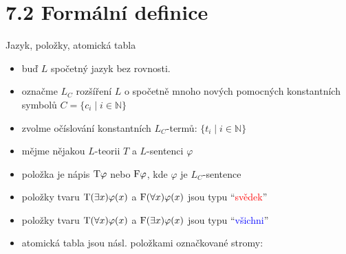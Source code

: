 \documentclass{beamer}
\begin{document}
\section{7.2 Formální definice}


\begin{frame}{Jazyk, položky, atomická tabla}

    \begin{itemize}
        \item buď $L$ \alert{spočetný} jazyk \alert{bez rovnosti}.
        \item označme $L_C$ rozšíření $L$ o spočetně mnoho nových \alert{pomocných} konstantních symbolů $C=\{c_i\mid i\in \mathbb N\}$
        \item zvolme očíslování konstantních $L_C$-termů: $\{t_i\mid i\in\mathbb N\}$
        \item mějme nějakou $L$-teorii $T$ a $L$-sentenci $\varphi$
        \item \alert{položka} je nápis $\mathrm{T}\varphi$ nebo $\mathrm{F}\varphi$, kde $\varphi$ je $L_C$-sentence
        \item položky tvaru $\mathrm{T}(\exists x)\varphi(x)$ a $\mathrm{F}(\forall x)\varphi(x)$ jsou \alert{typu} ``\textcolor{red}{svědek}''
        \item položky tvaru $\mathrm{T}(\forall x)\varphi(x)$ a $\mathrm{F}(\exists x)\varphi(x)$ jsou \alert{typu} ``\textcolor{blue}{všichni}'' 
        \item \alert{atomická tabla} jsou násl. položkami označkované stromy:
    \end{itemize}

\end{frame}
\end{document}

